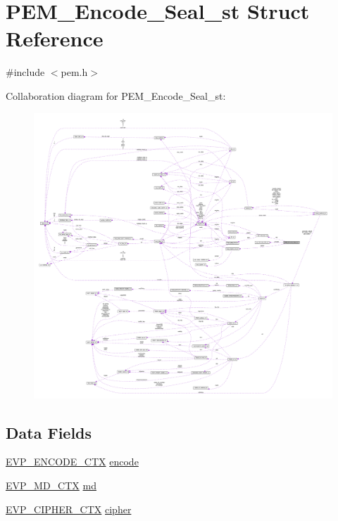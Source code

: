 \hypertarget{struct_p_e_m___encode___seal__st}{}\section{P\+E\+M\+\_\+\+Encode\+\_\+\+Seal\+\_\+st Struct Reference}
\label{struct_p_e_m___encode___seal__st}


{\ttfamily \#include $<$pem.\+h$>$}



Collaboration diagram for P\+E\+M\+\_\+\+Encode\+\_\+\+Seal\+\_\+st\+:\nopagebreak
\begin{figure}[H]
\begin{center}
\leavevmode
\includegraphics[width=350pt]{struct_p_e_m___encode___seal__st__coll__graph}
\end{center}
\end{figure}
\subsection*{Data Fields}
\begin{DoxyCompactItemize}
\item 
\hyperlink{crypto_2evp_2evp_8h_abaf2c67a32853bb1480c30819be5735e}{E\+V\+P\+\_\+\+E\+N\+C\+O\+D\+E\+\_\+\+C\+TX} \hyperlink{struct_p_e_m___encode___seal__st_a1928ce26a645ab3a2a1cde2d9124f761}{encode}
\item 
\hyperlink{crypto_2ossl__typ_8h_a69cda4d21bd068f01c469222c1dd92fe}{E\+V\+P\+\_\+\+M\+D\+\_\+\+C\+TX} \hyperlink{struct_p_e_m___encode___seal__st_a3baf08d652f4c55fed4cdd71ddf45b80}{md}
\item 
\hyperlink{crypto_2ossl__typ_8h_aab2bd6a044e1d31ebc2fe82b3b0b3d9a}{E\+V\+P\+\_\+\+C\+I\+P\+H\+E\+R\+\_\+\+C\+TX} \hyperlink{struct_p_e_m___encode___seal__st_a9c705fb8f37bc72da4bd64cd72068415}{cipher}
\end{DoxyCompactItemize}


